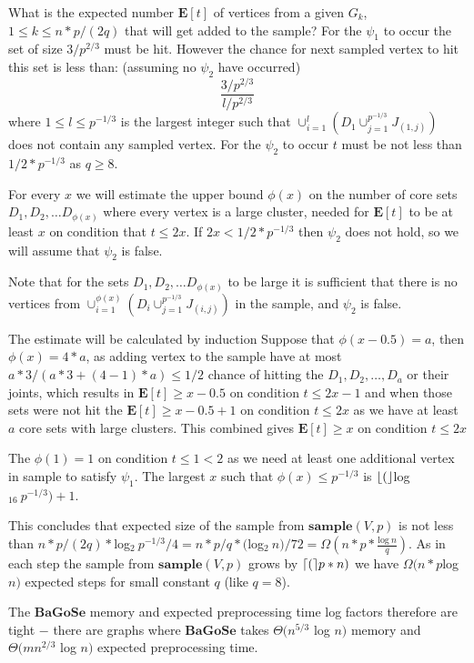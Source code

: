 \documentclass[shortabstract, lic, english]{iithesis}
\theoremstyle{definition} \newtheorem{definition}{Definition}[chapter]
\theoremstyle{remark} \newtheorem{remark}[definition]{Observation}
\theoremstyle{plain} \newtheorem{theorem}[definition]{Theorem}
\theoremstyle{plain} \newtheorem{lemma}[definition]{Lemma}
\theoremstyle{plain} \newtheorem{conjecture}[definition]{Conjecture}
\DeclarePairedDelimiter{\ceil}{\lceil}{\rceil}
\DeclarePairedDelimiter{\floor}{\lfloor}{\rfloor}
\begin{document}
What is the expected number $\mathbf{E}[t]$ of vertices from a given $G_k$, $1 \leq k \leq n*p/(2q)$ that will get added to the sample?
For the $\psi_1$ to occur the set of size $3/p^{2/3}$ must be hit. However the chance for next sampled vertex to hit this set is less than: (assuming no $\psi_2$ have occurred)
$$\frac{3/p^{2/3}}{l/p^{2/3}}$$
where $1 \leq l \leq p^{-1/3}$ is the largest integer such that $\cup_{i=1}^{l} (D_1 \cup_{j=1}^{p^{-1/3}} J_{(1, j)})$ does not contain any sampled vertex.
For the $\psi_2$ to occur $t$ must be not less than $1/2 * p^{-1/3}$ as $q \geq 8$.

For every $x$ we will estimate the upper bound $\phi(x)$ on the number of core sets $D_1, D_2, \ldots D_{\phi(x)}$ where every vertex is a large cluster, needed for $\mathbf{E}[t]$ to be at least $x$ on condition that $t \leq 2x$.
If $2x < 1/2 * p^{-1/3}$ then $\psi_2$ does not hold, so we will assume that $\psi_2$ is false.

Note that for the sets $D_1, D_2, \ldots D_{\phi(x)}$ to be large it is sufficient that there is no vertices from $\cup_{i=1}^{\phi(x)}(D_i \cup_{j=1}^{p^{-1/3}} J_{(i, j)})$ in the sample, and $\psi_2$ is false.

The estimate will be calculated by induction
Suppose that $\phi(x - 0.5) = a$, then $\phi(x) = 4*a$, as adding vertex to the sample have at most $a * 3 / (a * 3 + (4-1)*a) \leq 1/2$ chance of hitting the $D_1, D_2, \ldots, D_a$ or their joints, which results in $\mathbf{E}[t] \geq x - 0.5$ on condition $t \leq 2x - 1$ and
when those sets were not hit the $\mathbf{E}[t] \geq x - 0.5 + 1$ on condition $t \leq 2x$ as we have at least $a$ core sets with large clusters. This combined gives $\mathbf{E}[t] \geq x$ on condition $t \leq 2x$

The $\phi(1) = 1$ on condition $t \leq 1 < 2$ as we need at least one additional vertex in sample to satisfy $\psi_1$.
The largest $x$ such that $\phi(x) \leq p^{-1/3}$ is $\floor($log$_{16}~p^{-1/3}) + 1$.

This concludes that expected size of the sample from $\mathbf{sample}(V, p)$ is not less than
$n*p/(2q) * $log$_2~p^{-1/3}/4 = n*p/q * ($log$_2~ n)/72 = \Omega(n*p * \frac{\text{log}~n}{q})$.
As in each step the sample from $\mathbf{sample}(V, p)$ grows by $\ceil(p*n)$ we have $\Omega(n*p $log$ n)$ expected steps for small constant $q$ (like $q = 8$).

The $\mathbf{BaGoSe}$ memory and expected preprocessing time log factors therefore are tight $-$ there are graphs where $\mathbf{BaGoSe}$ takes $\Theta(n^{5/3} $ log $n)$ memory and $\Theta(mn^{2/3} $ log $n)$ expected preprocessing time.
\end{document}

